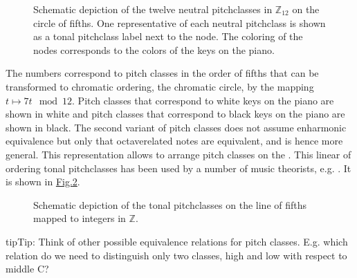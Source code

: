 \documentclass[letterpaper,10pt,english]{sphinxmanual}
\begin{document}
\begin{figure}[htbp]
\centering
\capstart

\noindent{}
\caption{Schematic depiction of the twelve neutral pitch\sphinxhyphen{}classes in \(\mathbb{Z}_{12}\) on the circle of fifths. One
representative of each neutral pitch\sphinxhyphen{}class is shown as a tonal pitch\sphinxhyphen{}class label next to the
node. The coloring of the nodes corresponds to the colors of the keys on the piano.}\label{\detokenize{tonality:id16}}\label{\detokenize{tonality:circle-of-fifths}}\end{figure}

The numbers correspond to pitch classes in the order of fifths that can be transformed to chromatic ordering, the
chromatic circle, by the mapping \(t \mapsto 7 t \mod 12\). Pitch classes that correspond to white
keys on the piano are shown in white and pitch classes that correspond to black keys on the
piano are shown in black. The second variant of pitch classes does not assume enharmonic
equivalence but only that octave\sphinxhyphen{}related notes are equivalent, and is hence more general.
This representation allows to arrange pitch classes on the  .
This linear of ordering tonal pitch\sphinxhyphen{}classes has been used by a number of music theorists, e.g.
. It is shown in \hyperref[\detokenize{tonality:line-of-fifths}]{Fig.\@ \ref{\detokenize{tonality:line-of-fifths}}}.

\begin{figure}[htbp]
\centering
\capstart

\noindent{}
\caption{Schematic depiction of the tonal pitch\sphinxhyphen{}classes on the line of fifths mapped to integers in \(\mathbb{Z}\).}\label{\detokenize{tonality:id17}}\label{\detokenize{tonality:line-of-fifths}}\end{figure}

\begin{sphinxadmonition}{tip}{Tip:}
Think of other possible equivalence relations for pitch classes.
E.g. which relation do we need to distinguish only two classes, high and low with respect to middle C?
\end{sphinxadmonition}
\end{document}
